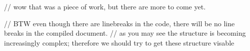 // wow that was a piece of work, but there are more to come yet.





// BTW even though there are linebreaks in the code, there will be no line breaks in the compiled document.
// as you may see the structure is becoming increasingly complex; therefore we should try to get these structure visable



